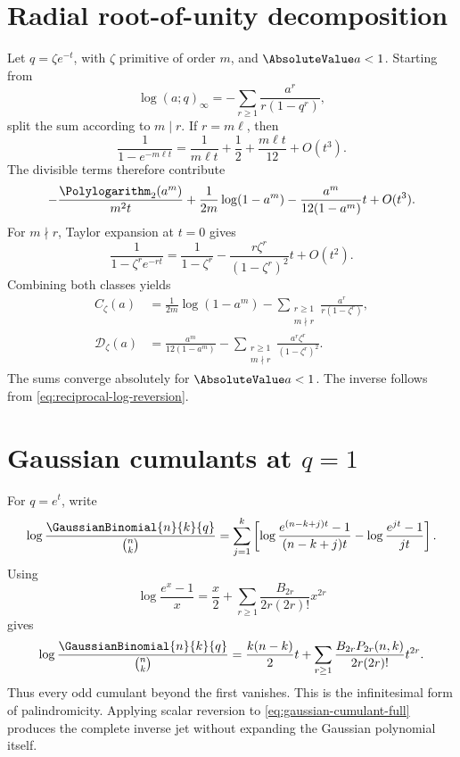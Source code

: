 \documentclass[11pt,letterpaper,oneside,openany]{book}
\theoremstyle{definition}
\theoremstyle{remark}
\newcommand{\Dcal}{\mathcal D}
\begin{document}
\section{Radial root-of-unity decomposition}
Let \(q=\zeta e^{-t}\), with \(\zeta\) primitive of order \(m\), and
\(\AbsoluteValue a<1\).  Starting from
\[
 \log(a;q)_\infty=-\sum_{r\ge1}\frac{a^r}{r(1-q^r)},
\]
split the sum according to \(m\mid r\).  If \(r=m\ell\), then
\[
 \frac1{1-e^{-m\ell t}}
 =\frac1{m\ell t}+\frac12+\frac{m\ell t}{12}+O(t^3).
\]
The divisible terms therefore contribute
\[
 -\frac{\Polylogarithm_2(a^m)}{m^2t}
 +\frac1{2m}\log(1-a^m)
 -\frac{a^m}{12(1-a^m)}t+O(t^3).
\]
For \(m\nmid r\), Taylor expansion at \(t=0\) gives
\[
 \frac1{1-\zeta^re^{-rt}}
 =\frac1{1-\zeta^r}
 -\frac{r\zeta^r}{(1-\zeta^r)^2}t+O(t^2).
\]
Combining both classes yields
\begin{align}
 C_\zeta(a)
 &=\frac1{2m}\log(1-a^m)
 -\sum_{\substack{r\ge1\\m\nmid r}}
  \frac{a^r}{r(1-\zeta^r)},\label{eq:Czeta-appendix}\\
 \Dcal_\zeta(a)
 &=\frac{a^m}{12(1-a^m)}
 -\sum_{\substack{r\ge1\\m\nmid r}}
  \frac{a^r\zeta^r}{(1-\zeta^r)^2}.
 \label{eq:Dzeta-appendix}
\end{align}
The sums converge absolutely for \(\AbsoluteValue a<1\).  The inverse follows from
\eqref{eq:reciprocal-log-reversion}.

\section{Gaussian cumulants at \texorpdfstring{\(q=1\)}{q=1}}
For \(q=e^t\), write
\[
 \log\frac{\GaussianBinomial{n}{k}{q}}{\binom nk}
 =\sum_{j=1}^{k}
 \left[
  \log\frac{e^{(n-k+j)t}-1}{(n-k+j)t}
  -\log\frac{e^{jt}-1}{jt}
 \right].
\]
Using
\[
 \log\frac{e^x-1}{x}
 =\frac x2+
 \sum_{r\ge1}\frac{B_{2r}}{2r(2r)!}x^{2r}
\]
gives
\begin{equation}\label{eq:gaussian-cumulant-full}
 \log\frac{\GaussianBinomial{n}{k}{q}}{\binom nk}
 =\frac{k(n-k)}2t+
 \sum_{r\ge1}\frac{B_{2r}P_{2r}(n,k)}{2r(2r)!}t^{2r}.
\end{equation}
Thus every odd cumulant beyond the first vanishes.  This is the infinitesimal
form of palindromicity.  Applying scalar reversion to
\eqref{eq:gaussian-cumulant-full} produces the complete inverse jet without
expanding the Gaussian polynomial itself.
\end{document}

